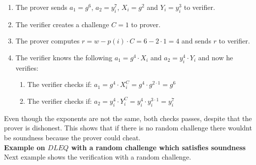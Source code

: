 \begin{enumerate}
    \item The prover sends $a_1=g^6$, $a_2=y_i^7$, $X_i=g^2$ and  $Y_i=y_i^3$ to verifier.
    \item The verifier creates a challenge \begin{math}C=1 \end{math} to prover.
    \item The prover computes \begin{math}r=w-p(i)  \cdot  C = 6-2  \cdot  1= 4\end{math} and sends $r$ to verifier.
    \item The verifier knows the following  $a_1=g^4  \cdot  X_i$ and $a_2=y_i^4  \cdot  Y_i$ and now he verifies:
    \begin{enumerate}        
        \item The verifier checks if:  \begin{math}a_1 = g^4 \cdot X_i^C = g^4 \cdot g^{2 \cdot 1} = g^6\end{math}
        \item The verifier checks if:  \begin{math} a_2=y_i^4  \cdot  Y_i^C = y_i^4  \cdot  y_i^{3 \cdot 1}= y_i^7 \end{math}
    \end{enumerate}
\end{enumerate}


\noindent
Even though the exponents are not the same, both checks passes, despite that the prover is dishonest. This shows that if there is no random challenge there wouldnt be soundness because the prover could cheat.\\

\noindent
\textbf{Example on $DLEQ$ with a random challenge which satisfies soundness}\\
Next example shows the verification with a random challenge.

